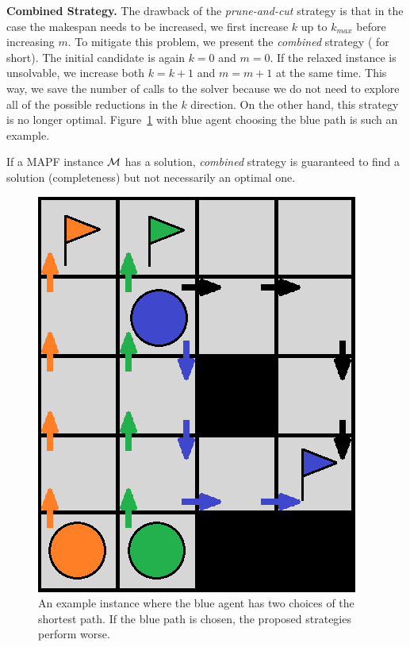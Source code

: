 


\textbf{Combined Strategy.}
%
The drawback of the \emph{prune-and-cut} strategy is that in the case the makespan needs to be increased, we first increase $k$ up to $k_{max}$ before increasing $m$. To mitigate this problem, we present the \emph{combined} strategy (\ssc{} for short). The initial candidate is again $k=0$ and $m=0$. If the relaxed instance is unsolvable, we increase both $k=k+1$ and $m=m+1$ at the same time. This way, we save the number of calls to the solver because we do not need to explore all of the possible reductions in the $k$ direction. On the other hand, this strategy is no longer optimal. Figure~\ref{fig:p_counterexample} with blue agent choosing the blue path is such an example.

\begin{prop}
If a MAPF instance $\mathcal{M}$ has a solution, \emph{combined} strategy is guaranteed to find a solution (completeness) but not necessarily an optimal one.~\cite{AAMAS_corridors}
\end{prop}


\begin{figure}[ht]
\centering
\includegraphics[width=0.3\columnwidth]{img/p_counterexample.png}
\caption{An example instance where the blue agent has two choices of the shortest path. If the blue path is chosen, the proposed strategies perform worse.}
\label{fig:p_counterexample}
\end{figure}



